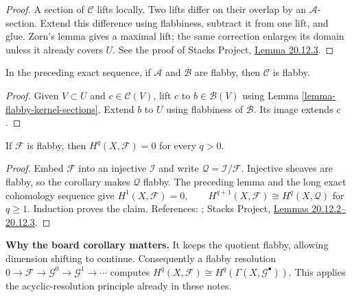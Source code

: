 \begin{proof}
A section of $\mathcal{C}$ lifts locally.
Two lifts differ on their overlap by an
$\mathcal{A}$-section. Extend this difference
using flabbiness, subtract it from one
lift, and glue. Zorn's lemma gives a
maximal lift; the same correction enlarges
its domain unless it already covers $U$.
See the proof of Stacks Project,
\href{https://stacks.math.columbia.edu/%
tag/09SV}{Lemma 20.12.3}.
\end{proof}

\begin{corollary}
\label{lemma-flabby-quotient}
In the preceding exact sequence, if
$\mathcal{A}$ and $\mathcal{B}$ are flabby,
then $\mathcal{C}$ is flabby.
\end{corollary}

\begin{proof}
Given $V\subset U$ and
$c\in\mathcal{C}(V)$, lift $c$ to
$b\in\mathcal{B}(V)$ using
Lemma \ref{lemma-flabby-kernel-sections}.
Extend $b$ to $U$ using flabbiness of
$\mathcal{B}$. Its image extends $c$.
\end{proof}

\begin{proposition}
\label{proposition-flabby-acyclic}
If $\mathcal{F}$ is flabby, then
$
H^q(X,\mathcal{F})=0
$
for every $q>0$.
\end{proposition}

\begin{proof}
Embed $\mathcal{F}$ into an injective
$\mathcal{I}$ and write
$\mathcal{Q}=\mathcal{I}/\mathcal{F}$.
Injective sheaves are flabby, so the
corollary makes $\mathcal{Q}$ flabby.
The preceding lemma and the long exact
cohomology sequence give
$
H^1(X,\mathcal{F})=0,\qquad
H^{q+1}(X,\mathcal{F})
\cong H^q(X,\mathcal{Q})
$
for $q\geq1$. Induction proves the claim.
References: \cite[III, Lemma 2.4 and
Proposition 2.5]{hart}; Stacks Project,
\href{https://stacks.math.columbia.edu/%
tag/09SV}{Lemmas 20.12.2--20.12.3}.
\end{proof}

\medskip\noindent
{\bf Why the board corollary matters.}
It keeps the quotient flabby, allowing
dimension shifting to continue.
Consequently a flabby resolution
$
0\to\mathcal{F}\to\mathcal{G}^0
\to\mathcal{G}^1\to\cdots
$
computes
$
H^q(X,\mathcal{F})
\cong H^q(\Gamma(X,\mathcal{G}^{\bullet})).
$
This applies the acyclic-resolution
principle already in these notes.


